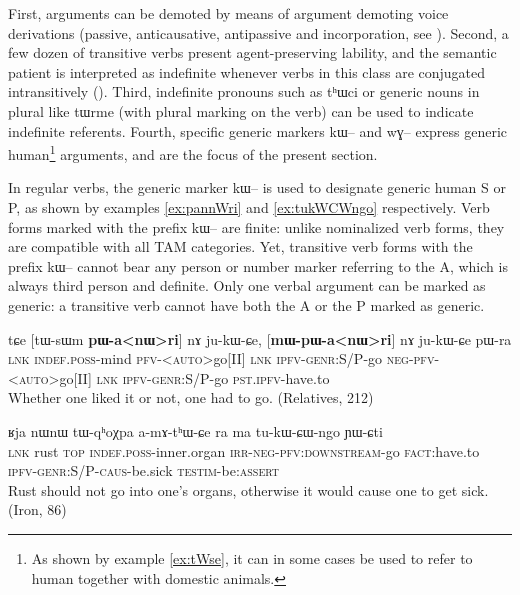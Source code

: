 \documentclass[oldfontcommands,oneside,a4paper,11pt]{article}
\newcommand{\ipa}[1]{{\phon \mbox{#1}}} %
\begin{document}
First, arguments can be demoted by means of argument demoting voice derivations (passive, anticausative,  antipassive and incorporation, see \citealt{jacques12incorp, jacques14antipassive}). Second, a few dozen of transitive verbs present agent-preserving lability, and the semantic patient is interpreted as indefinite whenever verbs in this class are conjugated intransitively (\citealt{jacques12demotion}).  Third, indefinite pronouns such as \ipa{tʰɯci} or generic nouns in plural like \ipa{tɯrme} (with plural marking on the verb) can be used to indicate indefinite referents. Fourth,  specific generic markers \ipa{kɯ--} and \ipa{wɣ--} express generic human\footnote{As shown by example \ref{ex:tWse}, it can in some cases be used to refer to human together with domestic animals.} arguments, and are the focus of the present section. 



In regular verbs, the generic marker \ipa{kɯ--} is used to designate generic human S or P, as shown by examples \ref{ex:pannWri} and \ref{ex:tukWCWngo} respectively. Verb forms marked with the prefix \ipa{kɯ--} are  finite: unlike nominalized verb forms, they are compatible with all TAM categories. Yet, transitive verb forms with the prefix \ipa{kɯ--} cannot bear any person or number marker referring to the A, which is always third person and definite. Only one verbal argument can be marked as generic: a transitive verb cannot have both the A or the P marked as generic.


\begin{exe}
\ex  \label{ex:pannWri}
\gll
\ipa{tɕe}  	[\ipa{tɯ-sɯm}  	\textbf{\ipa{pɯ-a<nɯ>ri}}]  	\ipa{nɤ}  	\ipa{ju-kɯ-ɕe,}  	[\textbf{\ipa{mɯ-pɯ-a<nɯ>ri}}]  	\ipa{nɤ}  	\ipa{ju-kɯ-ɕe}  	\ipa{pɯ-ra}  \\
\textsc{lnk} \textsc{indef.poss}-mind  \textsc{pfv-<auto>}go[II] \textsc{lnk} \textsc{ipfv-genr}:S/P-go \textsc{neg-pfv-<auto>}go[II] \textsc{lnk} \textsc{ipfv-genr}:S/P-go \textsc{pst.ipfv}-have.to \\
\glt Whether one liked it or not, one had to go. (Relatives, 212)
\end{exe}


\begin{exe}
\ex \label{ex:tukWCWngo}
\gll  \ipa{tɕe} 	\ipa{ʁja} 	\ipa{nɯnɯ} 	\ipa{tɯ-qʰoχpa} 	\ipa{a-mɤ-tʰɯ-ɕe} 	\ipa{ra} 	\ipa{ma} 	\ipa{tu-kɯ-ɕɯ-ngo} 	\ipa{ɲɯ-ɕti} \\
\textsc{lnk} rust \textsc{top} \textsc{indef.poss}-inner.organ \textsc{irr-neg-pfv:downstream}-go \textsc{fact}:have.to \textsc{ipfv-genr:S/P-caus}-be.sick  \textsc{testim}-be:\textsc{assert} \\
\glt Rust should not go into one's organs, otherwise it would cause one to get sick. (Iron, 86)
\end{exe}
\end{document}
